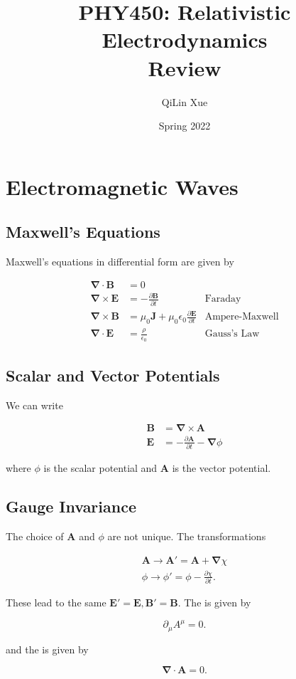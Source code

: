 \documentclass{article}
\title{PHY450: Relativistic Electrodynamics \\ Review}
\author{QiLin Xue}
\date{Spring 2022}
\numberwithin{equation}{subsection}
\begin{document}
\maketitle
\tableofcontents
\section{Electromagnetic Waves}
\subsection{Maxwell's Equations}
Maxwell's equations in differential form are given by
\begin{meq}
    \vspace{-4mm}
    \begin{align}
        \bm{\nabla}\cdot \bm{B} &= 0 \\ 
        \bm{\nabla}\times \bm{E} &= -\frac{\partial \bm{B}}{\partial t} & \text{Faraday}\\ 
        \bm{\nabla} \times \bm{B} &= \mu_0 \bm{J} + \mu_0\epsilon_0 \frac{\partial \bm{E}}{\partial t} & \text{Ampere-Maxwell}\\ 
        \bm{\nabla}\cdot \bm{E} &= \frac{\rho}{\epsilon_0} & \text{Gauss's Law}
    \end{align}
\end{meq}
\subsection{Scalar and Vector Potentials}
We can write
\begin{meq}
    \begin{align}
        \bm{B} &= \bm{\nabla} \times \bm{A} \\ 
        \bm{E} &= - \frac{\partial \bm{A}}{\partial t} -\bm{\nabla}\phi
    \end{align}
\end{meq}
where $\phi$ is the scalar potential and $\bm{A}$ is the vector potential.
\subsection{Gauge Invariance}
The choice of $\bm{A}$ and $\phi$ are not unique. The transformations 
\begin{meq}
    \begin{align}
        \bm{A} \to \bm{A}' = \bm{A} + \bm{\nabla}\chi \\ 
        \phi \to \phi' = \phi - \frac{\partial \chi}{\partial t}.
    \end{align}
\end{meq}
These lead to the same $\bm{E}'=\bm{E},\bm{B}'=\bm{B}.$ The  is given by
\begin{meq}
    \begin{equation}
        \partial_\mu A^{\mu} = 0.
    \end{equation}
\end{meq}
and the  is given by 
\begin{meq}
    \begin{equation}
        \bm{\nabla} \cdot \bm{A} = 0.
    \end{equation}
\end{meq}
\end{document}
